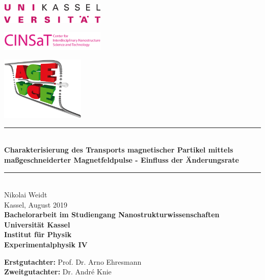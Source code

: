 \begin{titlepage}
  \begin{center}
    \begin{minipage}[T]{0.3\textwidth}
      \begin{flushleft}
        \includegraphics[width=5cm]{img/Uni}
      \end{flushleft}
    \end{minipage}
    \begin{minipage}[T]{0.3\textwidth}
      \centering
      \includegraphics[width=5cm]{img/CINSaT}
    \end{minipage}
    \begin{minipage}[T]{0.3\textwidth}
      \begin{flushright}
        \includegraphics[width=4cm]{img/AGE}
      \end{flushright}
    \end{minipage}
  \end{center}


  \begin{center}
    \rule{\columnwidth}{1 pt}\\
    \vspace{0.5cm}
    {\LARGE
      \textbf{Charakterisierung des Transports magnetischer Partikel mittels maßgeschneiderter Magnetfeldpulse - Einfluss der Änderungsrate} \\ 
    }
    \rule{\columnwidth}{1 pt}\\
    \vspace{2cm}
    {\Large
      Nikolai Weidt\\
      Kassel, August 2019\\
      \vspace{1.5cm}
    }
    {\bfseries
    Bachelorarbeit im Studiengang Nanostrukturwissenschaften\\ 
    Universität Kassel\\
    Institut für Physik\\
    Experimentalphysik IV\\
    }
    \end{center}
      \vfill
      {\begin{tabbing}
      \textbf{Erstgutachter:} Prof. Dr. Arno Ehresmann \\
      \textbf{Zweitgutachter:} Dr. André Knie\\
      \end{tabbing}
      }

\end{titlepage}
\restoregeometry
